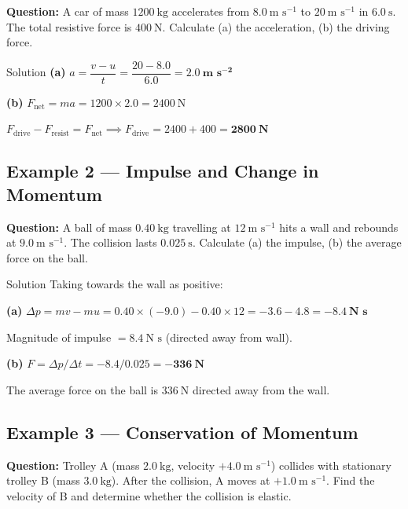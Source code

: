 \textbf{Question:} A car of mass $1200\ \text{kg}$ accelerates from $8.0\ \text{m s}^{-1}$ to $20\ \text{m s}^{-1}$ in $6.0\ \text{s}$. The total resistive force is $400\ \text{N}$. Calculate (a) the acceleration, (b) the driving force.

\begin{examplebox}{Solution}
\textbf{(a)} $a = \dfrac{v - u}{t} = \dfrac{20 - 8.0}{6.0} = \mathbf{2.0\ \text{m s}^{-2}}$

\vspace{0.3em}
\textbf{(b)} $F_{\text{net}} = ma = 1200 \times 2.0 = 2400\ \text{N}$

$F_{\text{drive}} - F_{\text{resist}} = F_{\text{net}} \implies F_{\text{drive}} = 2400 + 400 = \mathbf{2800\ \text{N}}$
\end{examplebox}

\subsection*{Example 2 --- Impulse and Change in Momentum}

\textbf{Question:} A ball of mass $0.40\ \text{kg}$ travelling at $12\ \text{m s}^{-1}$ hits a wall and rebounds at $9.0\ \text{m s}^{-1}$. The collision lasts $0.025\ \text{s}$. Calculate (a) the impulse, (b) the average force on the ball.

\begin{examplebox}{Solution}
Taking towards the wall as positive:

\textbf{(a)} $\Delta p = mv - mu = 0.40\times(-9.0) - 0.40\times12 = -3.6 - 4.8 = \mathbf{-8.4\ \text{N s}}$

Magnitude of impulse $= 8.4\ \text{N s}$ (directed away from wall).

\vspace{0.3em}
\textbf{(b)} $F = \Delta p / \Delta t = -8.4/0.025 = \mathbf{-336\ \text{N}}$

The average force on the ball is $336\ \text{N}$ directed away from the wall.
\end{examplebox}

\subsection*{Example 3 --- Conservation of Momentum}

\textbf{Question:} Trolley A (mass $2.0\ \text{kg}$, velocity $+4.0\ \text{m s}^{-1}$) collides with stationary trolley B (mass $3.0\ \text{kg}$). After the collision, A moves at $+1.0\ \text{m s}^{-1}$. Find the velocity of B and determine whether the collision is elastic.


